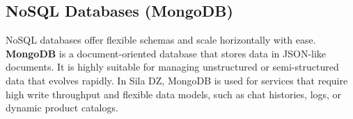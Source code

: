 \subsection{NoSQL Databases (MongoDB)}
NoSQL databases offer flexible schemas and scale horizontally with ease. \textbf{MongoDB} is a document-oriented database that stores data in JSON-like documents. It is highly suitable for managing unstructured or semi-structured data that evolves rapidly. In Sila DZ, MongoDB is used for services that require high write throughput and flexible data models, such as chat histories, logs, or dynamic product catalogs.
